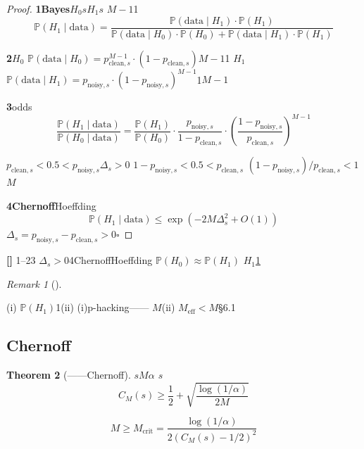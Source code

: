 \documentclass[11pt,a4paper]{article}
\newtheorem{theorem}{Theorem}[section]
\theoremstyle{remark}
\newtheorem{remark}[theorem]{Remark}
\newcommand{\rigorous}{\textnormal{\textbf{[]}}}
\begin{document}
\begin{proof}
\textbf{1Bayes}$H_0$$s$$H_1$$s$
$M-1$1
\begin{equation}
    \mathbb{P}(H_1 \mid \text{data})
    = \frac{\mathbb{P}(\text{data} \mid H_1) \cdot \mathbb{P}(H_1)}
           {\mathbb{P}(\text{data} \mid H_0) \cdot \mathbb{P}(H_0) + \mathbb{P}(\text{data} \mid H_1) \cdot \mathbb{P}(H_1)}
\end{equation}

\textbf{2}$H_0$
$\mathbb{P}(\text{data} \mid H_0) = p_{\text{clean}, s}^{M-1} \cdot (1-p_{\text{clean}, s})$$M-1$1
$H_1$
$\mathbb{P}(\text{data} \mid H_1) = p_{\text{noisy}, s} \cdot (1-p_{\text{noisy}, s})^{M-1}$1$M-1$

\textbf{3}odds
\begin{equation}
    \frac{\mathbb{P}(H_1 \mid \text{data})}{\mathbb{P}(H_0 \mid \text{data})}
    = \frac{\mathbb{P}(H_1)}{\mathbb{P}(H_0)} \cdot
      \frac{p_{\text{noisy}, s}}{1-p_{\text{clean}, s}} \cdot
      \left(\frac{1-p_{\text{noisy}, s}}{p_{\text{clean}, s}}\right)^{M-1} 
\end{equation}

$p_{\text{clean}, s} < 0.5 < p_{\text{noisy}, s}$$\Delta_s > 0$
$1-p_{\text{noisy}, s} < 0.5 < p_{\text{clean}, s}$
$(1-p_{\text{noisy}, s})/p_{\text{clean}, s} < 1$$M$

\textbf{4Chernoff}Hoeffding
\begin{equation}
    \mathbb{P}(H_1 \mid \text{data}) \leq \exp(-2M\Delta_s^2 + O(1))
\end{equation}
$\Delta_s = p_{\text{noisy}, s} - p_{\text{clean}, s} > 0$\hfill $\square$
\end{proof}

\rigorous{} \textbf{}1--23
$\Delta_s > 0$4ChernoffHoeffding
$\mathbb{P}(H_0) \approx \mathbb{P}(H_1)$
$H_1$\ref{rem:prior}

\begin{remark}[]
\label{rem:prior}

(i) $\mathbb{P}(H_1)$1(ii) 
(i)p-hacking——
$M$(ii)
$M_{\text{eff}} < M$\S6.1
\end{remark}

\subsection{Chernoff}

\begin{theorem}[——Chernoff]
\label{thm:consensus_chernoff}
$s$$M$$\alpha$
$s$
\begin{equation}
    \boxed{C_M(s) \geq \frac{1}{2} + \sqrt{\frac{\log(1/\alpha)}{2M}}} 
\end{equation}

\begin{equation}
    \boxed{M \geq M_{\text{crit}} = \frac{\log(1/\alpha)}{2(C_M(s) - 1/2)^2}} 
\end{equation}
\end{theorem}
\end{document}

